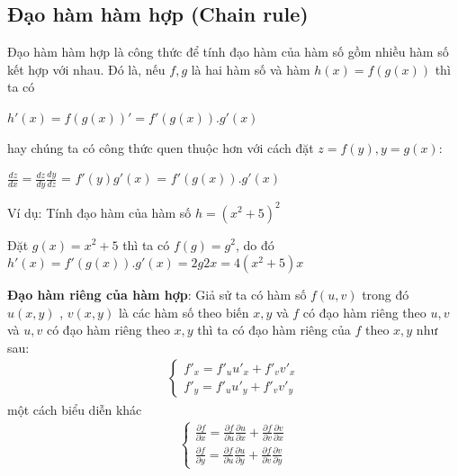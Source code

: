 \subsection{Đạo hàm hàm hợp (Chain rule)}

Đạo hàm hàm hợp là công thức để tính đạo hàm của hàm số gồm nhiều hàm số kết hợp với nhau. Đó là, nếu $f, g$ là hai hàm số và hàm $h(x) = f(g(x))$ thì ta có 
\begin{center}
$h'(x) = f(g(x))' = f'(g(x)).g'(x) $

\end{center}
hay chúng ta có công thức quen thuộc hơn với cách đặt $z=f(y), y=g(x)$:
\begin{center}
$\frac{dz}{dx} = \frac{dz}{dy} \frac{dy}{dz}$ = $f'(y)g'(x)$ = $f'(g(x)).g'(x)$
\end{center}

Ví dụ: Tính đạo hàm của hàm số $h=(x^2+5)^2$\par
 Đặt $g(x) = x^2 +5$ thì ta có $f(g) = g^2$, do đó $h'(x) = f'(g(x)).g'(x) = 2g2x= 4(x^2 +5)x$\\ \par
\textbf{Đạo hàm riêng của hàm hợp}: Giả sử ta có hàm số $f(u,v)$ trong đó $u(x,y)$ , $v(x,y)$ là các hàm số  theo biến $x,y$ và $f$ có đạo hàm riêng theo $u,v$ và $u,v$ có đạo hàm riêng theo $x,y$ thì ta có đạo hàm riêng của $f$ theo $x,y$ như sau:
\begin{align*}
	\begin{cases}
        f'_{x} = f'_{u}u'_{x} +f'_{v}v'_{x}\\
       f'_{y} = f'_{u}u'_{y} +f'_{v}v'_{y}
    \end{cases}
\end{align*}
một cách biểu diễn khác
\begin{align}
	\begin{cases}
		\frac{\partial f}{\partial x} = 
		\frac{\partial f}{\partial u}\frac{\partial u}{\partial x} + 
		\frac{\partial f}{\partial v}\frac{\partial v}{\partial x}\\[5mm]
		\frac{\partial f}{\partial y} = \frac{\partial f}{\partial u}\frac{\partial u}{\partial y} +
		 \frac{\partial f}{\partial v}\frac{\partial v}{\partial y}
	\end{cases}
\end{align}
